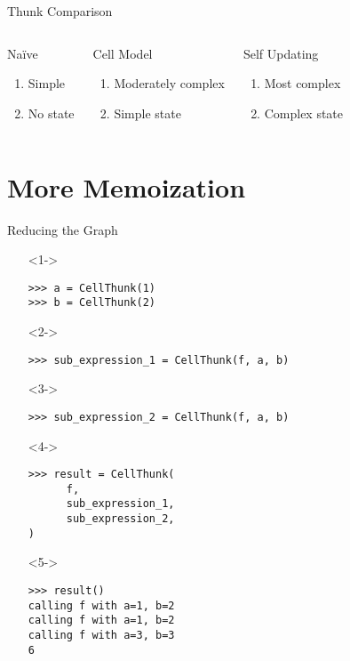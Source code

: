 \documentclass{beamer}
\begin{document}
\begin{frame}{Thunk Comparison}
  \begin{columns}[c]

    \begin{block}{Na\"ive}
      \begin{enumerate}
      \item Simple
      \item No state
      \end{enumerate}
    \end{block}

    \begin{block}{Cell Model}
      \begin{enumerate}
      \item Moderately complex
      \item Simple state
      \end{enumerate}
    \end{block}

    \begin{block}{Self Updating}
      \begin{enumerate}
      \item Most complex
      \item Complex state
      \end{enumerate}
    \end{block}
  \end{columns}
\end{frame}

\section{More Memoization}

\begin{frame}[fragile]{Reducing the Graph}
  \begin{itemize}
  \item[]<1-> \begin{verbatim}
>>> a = CellThunk(1)
>>> b = CellThunk(2)
    \end{verbatim}
  \item[]<2-> \begin{verbatim}
>>> sub_expression_1 = CellThunk(f, a, b)
    \end{verbatim}
  \item[]<3-> \begin{verbatim}
>>> sub_expression_2 = CellThunk(f, a, b)
    \end{verbatim}
  \item[]<4-> \begin{verbatim}
>>> result = CellThunk(
      f,
      sub_expression_1,
      sub_expression_2,
)
    \end{verbatim}
  \item[]<5-> \begin{verbatim}
>>> result()
calling f with a=1, b=2
calling f with a=1, b=2
calling f with a=3, b=3
6
    \end{verbatim}
  \end{itemize}
\end{frame}
\end{document}
